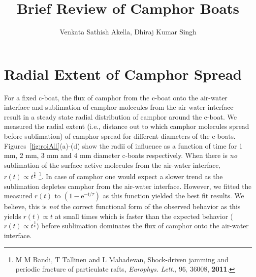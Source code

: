 \documentclass[12pt]{article}
\begin{document}
\author{Venkata Sathish Akella, Dhiraj Kumar Singh}
\title{Brief Review of Camphor Boats}
\maketitle

\section{Radial Extent of Camphor Spread}
For a fixed c-boat, the flux of camphor from the c-boat onto the air-water interface and sublimation of camphor molecules from the air-water interface result in a steady state radial distribution of camphor around the c-boat. We measured the radial extent (i.e., distance out to which camphor molecules spread before sublimation) of camphor spread for different diameters of the c-boats. Figures~\ref{fig:roiAll}(a)-(d) show the radii of influence as a function of time for 1 mm, 2 mm, 3 mm and 4 mm diameter c-boats respectively. 
When there is \emph{no} sublimation of the surface active molecules from the air-water interface, $r(t) \propto t^{\frac{3}{4}}$ \footnote{\label{ref:mmb}M M Bandi, T Tallinen and L Mahadevan, Shock-driven jamming and periodic fracture of particulate rafts, \emph{Europhys. Lett.}, 96, 36008, {\bf 2011}.}. In case of camphor one would expect a slower trend as the sublimation depletes camphor from the air-water interface. However, we fitted the measured $r(t)$ to $(1-\mathrm{e}^{-t/\tau})$ as this function yielded the best fit results. We believe, this is \emph{not} the correct functional form of the observed behavior as this yields $r(t) \propto t$ at small times which is faster than the expected behavior ($r(t) \propto t^{\frac{3}{4}}$) before sublimation dominates the flux of camphor onto the air-water interface. 
\end{document}
